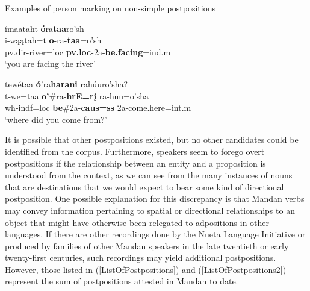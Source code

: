 \newpage

\begin{exe}

\item\label{NonSimplePostpositionsExamples} Examples of person marking on non-simple postpositions

\begin{xlist}

\item\label{NonSimplePostpositionsExamples1} \glll ímaataht \textbf{ó}ra\textbf{taa}ro'sh\\
    i-wąątah=t \textbf{o}-ra-\textbf{taa}=o'sh\\
    pv.dir-\textnormal{river}=loc \textbf{pv.loc}-2a-\textbf{\textnormal{be.facing}}=ind.m\\
    \glt `you are facing the river' \citep[35]{hollow1973a}

\item\label{NonSimplePostpositionsExamples2} \glll tewétaa \textbf{ó}'ra\textbf{harani} rahúuro'sha?\\
    t-we=taa \textbf{o'}\#ra-\textbf{hrE=rį} ra-huu=o'sha\\
    wh-indf=loc \textbf{\textnormal{be}}\#2a-\textbf{caus=ss} 2a-\textnormal{come.here}=int.m\\
    \glt `where did you come from?' \citep[299]{hollow1973a}

\end{xlist}

\end{exe}

It is possible that other postpositions existed, but no other candidates could be identified from the corpus. Furthermore, speakers seem to forego overt postpositions if the relationship between an entity and a proposition is understood from the context, as we can see from the many instances of nouns that are destinations that we would expect to bear some kind of directional postposition. One possible explanation for this discrepancy is that Mandan verbs may convey information pertaining to spatial or directional relationships to an object that might have otherwise been relegated to adpositions in other languages. If there are other recordings done by the Nueta Language Initiative or produced by families of other Mandan speakers in the late twentieth or early twenty-first centuries, such recordings may yield additional postpositions. However, those listed in (\ref{ListOfPostpositions}) and (\ref{ListOfPostpositions2}) represent the sum of postpositions attested in Mandan to date.
 
